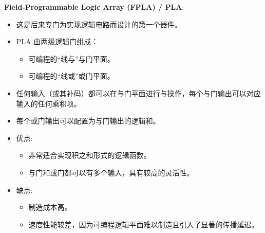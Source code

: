 \documentclass[
  ignorenonframetext,
  chinese,
]{beamer}
\providecommand{\tightlist}{%
  \setlength{\itemsep}{0pt}\setlength{\parskip}{0pt}}
\begin{document}
\begin{frame}
\begin{block}{\textbf{Field-Programmable Logic Array (FPLA) / PLA}:}
\label{field-programmable-logic-array-fpla-pla}
\begin{itemize}
\tightlist
\item
  这是后来专门为实现逻辑电路而设计的第一个器件。
\item
  PLA 由两级逻辑门组成：

  \begin{itemize}
  \tightlist
  \item
    可编程的``线与''与门平面。
  \item
    可编程的``线或''或门平面。
  \end{itemize}
\item
  任何输入（或其补码）都可以在与门平面进行与操作，每个与门输出可以对应输入的任何乘积项。
\item
  每个或门输出可以配置为与门输出的逻辑和。
\item
  优点:

  \begin{itemize}
  \tightlist
  \item
    非常适合实现积之和形式的逻辑函数。
  \item
    与门和或门都可以有多个输入，具有较高的灵活性。
  \end{itemize}
\item
  缺点:

  \begin{itemize}
  \tightlist
  \item
    制造成本高。
  \item
    速度性能较差，因为可编程逻辑平面难以制造且引入了显著的传播延迟。
  \end{itemize}
\end{itemize}
\end{block}
\end{frame}
\end{document}
